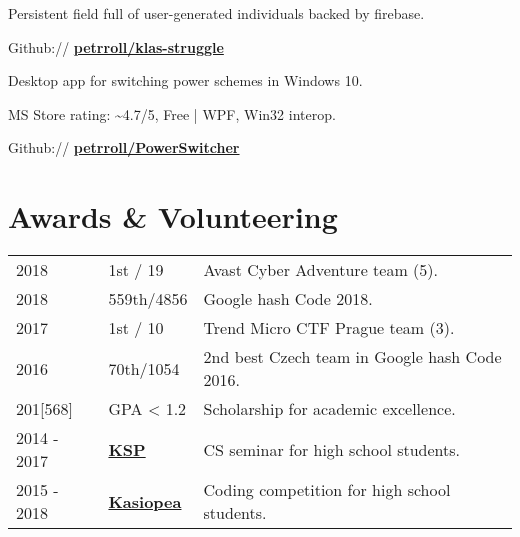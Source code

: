 \documentclass[a4paper]{deedy-resume} %
\begin{document}
\begin{minipage}[t]{0.62\textwidth}
\sectionspace %



\emptyLocation %
\begin{tightitemize}
\item Persistent field full of user-generated individuals backed by firebase.
\item Github:// \href{https://github.com/petrroll/klas-struggle}{\bf petrroll/klas-struggle}
\end{tightitemize}

\sectionspace %


\emptyLocation %
\begin{tightitemize}
\item Desktop app for switching power schemes in Windows 10.
\item MS Store rating: \textasciitilde4.7/5, Free | WPF, Win32 interop.
\item Github:// \href{https://github.com/petrroll/PowerSwitcher}{\bf petrroll/PowerSwitcher}
\end{tightitemize}

\sectionspace %


\section{Awards \& Volunteering} 

\begin{tabular}{lll}
2018 & 1st / 19 & Avast Cyber Adventure team (5). \\
2018 & 559th/4856 & Google hash Code 2018. \\
2017 & 1st / 10 & Trend Micro CTF Prague team (3). \\
2016 & 70th/1054 & 2nd best Czech team in Google hash Code 2016. \\
201[568] & GPA < 1.2 & Scholarship for academic excellence. \\
2014 - 2017 & \href{https://ksp.mff.cuni.cz/}{\bf KSP} & CS seminar for high school students. \\
2015 - 2018 & \href{https://kasiopea.matfyz.cz/}{\bf Kasiopea} & Coding competition for high school students. \\
\end{tabular}


\end{minipage}
\end{document}
